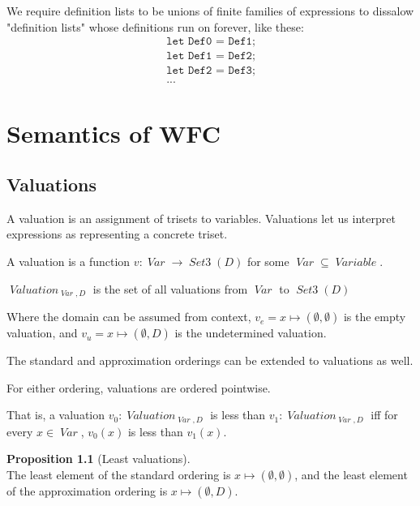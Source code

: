 \documentclass[oneside,12pt]{book}
\theoremstyle{definition}
\newtheorem{proposition}[theorem]{Proposition}
\theoremstyle{remark}
\newcommand\var[1]{\mathop{\mathit{#1}}\nolimits}
\newcommand{\Var}{\var{Var}}
\newcommand{\SetIII}{\var{Set3}}
\newcommand{\Variable}{\var{Variable}}
\newcommand{\Valuation}{\var{Valuation}}
\begin{document}
We require definition lists to be unions of finite families of expressions
to dissalow "definition lists" whose definitions run on forever, like these:
\begin{gather*}
  \texttt{let Def0 = Def1;} \\
  \texttt{let Def1 = Def2;} \\
  \texttt{let Def2 = Def3;} \\
  \texttt{...}
\end{gather*}


\chapter{Semantics of WFC}
\section{Valuations}

A valuation is an assignment of trisets to variables. Valuations
let us interpret expressions as representing a concrete triset.

\begin{defBox}
  A valuation is a function $v\colon \Var \to \SetIII(D)$ for some
  $\Var \subseteq \Variable$.
  
  \medskip \noindent $\Valuation_{\Var,D}$ is the set of all valuations
  from $\Var$ to $\SetIII(D)$
  
  \medskip \noindent Where the domain can be assumed from context,
  $v_e = x \mapsto (\emptyset, \emptyset)$ is the empty valuation,
  and $v_u = x \mapsto (\emptyset, D)$ is the undetermined valuation.
\end{defBox}

The standard and approximation orderings can be extended to valuations as well.

\begin{defBox}
  For either ordering, valuations are ordered pointwise.
  
  \medskip \noindent That is, a valuation $v_0\colon \Valuation_{\Var,D}$
  is less than $v_1\colon \Valuation_{\Var,D}$ iff for every $x \in \Var$,
  $v_0(x)$ is less than $v_1(x)$.
\end{defBox}

\begin{proposition}[Least valuations]\label{leastVal} \hfill \\
  The least element of the standard ordering is
  $x \mapsto (\emptyset, \emptyset)$, and the least element of the approximation
  ordering is $x \mapsto (\emptyset, D)$.
\end{proposition}
\end{document}
